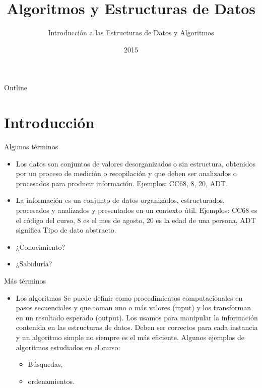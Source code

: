 \documentclass[aspectratio=169]{beamer}
\title{Algoritmos y Estructuras de Datos}
\subtitle{Introducción a las Estructuras de Datos y Algoritmos}
\date{2015}
\institute{\href{http://www.upc.edu.pe}{Universidad Peruana de Ciencias Aplicadas}}
\begin{document}
\maketitle

\begin{frame}{Outline}
  \tableofcontents
\end{frame}

\section{Introducción}

\begin{frame}{Algunos términos}

  \begin{itemize}
    \item Los \alert{datos} son conjuntos de valores desorganizados o sin estructura, obtenidos por un proceso de medición o recopilación y que deben ser analizados o procesados para producir información. Ejemplos: CC68, 8, 20, ADT.
    \item La \alert{información} es un conjunto de datos organizados, estructurados, procesados y analizados y presentados en un contexto útil. Ejemplos: CC68 es el código del curso, 8 es el mes de agosto, 20 es la edad de una persona, ADT significa Tipo de dato abstracto.
    \item ¿Conocimiento?
    \item ¿Sabiduría?
  \end{itemize}

\end{frame}

\begin{frame}{Más términos}

  \begin{itemize}
    \item Los \alert{algoritmos} Se puede definir como procedimientos computacionales en pasos secuenciales y que toman uno o más valores (input) y los transforman en un resultado esperado (output). Los usamos para manipular la información contenida en las estructuras de datos. Deben ser correctos para cada instancia y un algoritmo simple no siempre es el más eficiente. Algunos ejemplos de algoritmos estudiados en el curso:
    \begin{itemize}
      \item Búsquedas,
      \item ordenamientos.
    \end{itemize}
  \end{itemize}

\end{frame}
\end{document}
